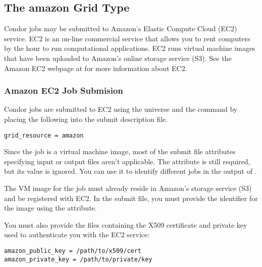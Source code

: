 \subsection{\label{sec:Amazon}The amazon Grid Type }

Condor jobs may be submitted to Amazon's Elastic Compute Cloud (EC2)
service.
EC2 is an on-line commercial service that allows you to rent computers
by the hour to run computational applications.
EC2 runs virtual machine images that have been uploaded to Amazon's
online storage service (S3).
See the Amazon EC2 webpage at  for more
information about EC2.

\subsubsection{\label{sec:Amazon-submit}Amazon EC2 Job Submision}

Condor jobs are submitted to EC2
using the  universe and the
 command  by placing the following
into the submit description file.
\begin{verbatim}
grid_resource = amazon
\end{verbatim}

Since the job is a virtual machine image, most of the submit file
attributes specifying input or output files aren't applicable. The
 attribute is still required, but its value is
ignored. You can use it to identify different jobs in the output of
.

The VM image for the job must already reside in Amazon's storage
service (S3) and be registered with EC2. In the submit file, you
must provide the identifier for the image using the
 attribute.

You must also provide the files containing the X509 certificate and
private key used to authenticate you with the EC2 service:

\begin{verbatim}
amazon_public_key = /path/to/x509/cert
amazon_private_key = /path/to/private/key
\end{verbatim}

